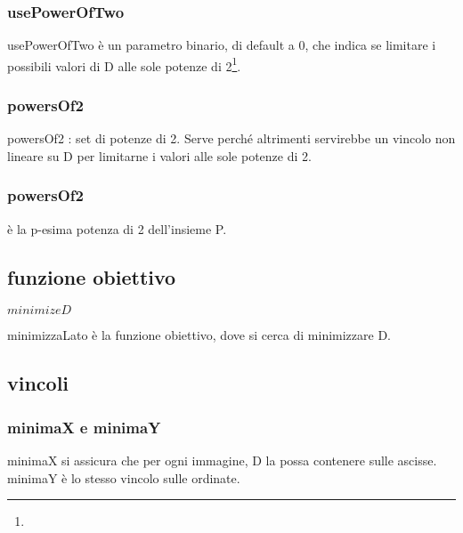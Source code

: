 \subsubsection{usePowerOfTwo}
usePowerOfTwo è un parametro binario, di default a 0, che indica se limitare i possibili valori di D alle sole potenze di 2\footnote{\footTwoPowers}.

\subsubsection{powersOf2}
powersOf2 : set di potenze di 2. Serve perché altrimenti servirebbe un vincolo non lineare su D per limitarne i valori alle sole potenze di 2. \\

\subsubsection{powersOf2}
\powersOfTp{} è la p-esima potenza di 2 dell'insieme P. 















\subsection{funzione obiettivo}
\begin{math}
 minimize D
\end{math}

minimizzaLato è la funzione obiettivo, dove si cerca di minimizzare D.




\subsection{vincoli}

\subsubsection{minimaX e minimaY}
minimaX si assicura che per ogni immagine, D la possa contenere sulle ascisse. \\
minimaY è lo stesso vincolo sulle ordinate.

